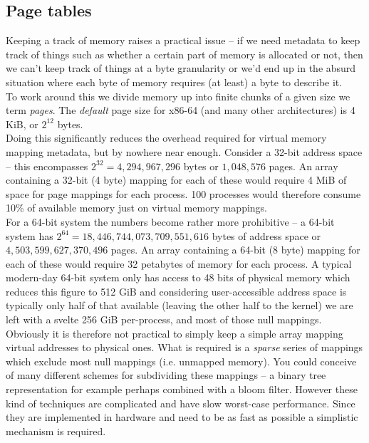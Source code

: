 \subsection{Page tables}
 Keeping a track of memory raises a practical issue -- if we
need metadata to keep track of things such as whether a certain part of memory
is allocated or not, then we can't keep track of things at a byte granularity or
we'd end up in the absurd situation where each byte of memory requires (at
least) a byte to describe it.\\

To work around this we divide memory up into finite chunks of a given size we
term \emph{pages}. The \emph{default} page size for x86-64 (and
many other architectures) is 4 KiB, or $2^{12}$ bytes.\\

Doing this significantly reduces the overhead required for virtual memory
mapping metadata, but by nowhere near enough. Consider a 32-bit address space --
this encompasses $2^{32} = 4,294,967,296$ bytes or $1,048,576$
pages. An array containing a 32-bit (4 byte) mapping for each of these would
require 4 MiB of space for page mappings for each process. 100 processes would
therefore consume 10\% of available memory just on virtual memory mappings.\\

For a 64-bit system the numbers become rather more prohibitive -- a 64-bit
system has $2^{64} = 18,446,744,073,709,551,616$ bytes of address space or
$4,503,599,627,370,496$ pages. An array containing a 64-bit (8 byte) mapping for
each of these would require 32 petabytes of memory for each process. A typical
modern-day 64-bit system only has access to 48 bits of physical memory which
reduces this figure to 512 GiB and considering user-accessible address space is
typically only half of that available (leaving the other half to the kernel) we
are left with a svelte 256 GiB per-process, and most of those null mappings.\\

Obviously it is therefore not practical to simply keep a simple array mapping
virtual addresses to physical ones. What is required is a \emph{sparse} series
of mappings which exclude most null mappings (i.e. unmapped memory). You could
conceive of many different schemes for subdividing these mappings -- a binary
tree representation for example perhaps combined with a bloom filter. However
these kind of techniques are complicated and have slow worst-case
performance. Since they are implemented in hardware and need to be as fast as
possible a simplistic mechanism is required.\\

